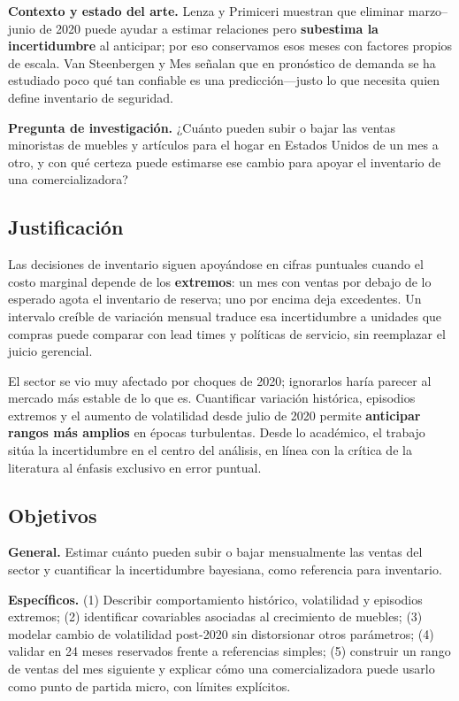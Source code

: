 \documentclass[twocolumn,10pt]{article}
\begin{document}
\textbf{Contexto y estado del arte.} Lenza y Primiceri \citep{lenza2022} muestran que eliminar marzo--junio de 2020 puede ayudar a estimar relaciones pero \textbf{subestima la incertidumbre} al anticipar; por eso conservamos esos meses con factores propios de escala. Van Steenbergen y Mes \citep{vansteenbergen2020} señalan que en pronóstico de demanda se ha estudiado poco qué tan confiable es una predicción---justo lo que necesita quien define inventario de seguridad.

\textbf{Pregunta de investigación.} ¿Cuánto pueden subir o bajar las ventas minoristas de muebles y artículos para el hogar en Estados Unidos de un mes a otro, y con qué certeza puede estimarse ese cambio para apoyar el inventario de una comercializadora?

\subsection{Justificación}
Las decisiones de inventario siguen apoyándose en cifras puntuales cuando el costo marginal depende de los \textbf{extremos}: un mes con ventas por debajo de lo esperado agota el inventario de reserva; uno por encima deja excedentes. Un intervalo creíble de variación mensual traduce esa incertidumbre a unidades que compras puede comparar con lead times y políticas de servicio, sin reemplazar el juicio gerencial.

El sector se vio muy afectado por choques de 2020; ignorarlos haría parecer al mercado más estable de lo que es. Cuantificar variación histórica, episodios extremos y el aumento de volatilidad desde julio de 2020 permite \textbf{anticipar rangos más amplios} en épocas turbulentas. Desde lo académico, el trabajo sitúa la incertidumbre en el centro del análisis, en línea con la crítica de la literatura al énfasis exclusivo en error puntual.

\subsection{Objetivos}
\textbf{General.} Estimar cuánto pueden subir o bajar mensualmente las ventas del sector y cuantificar la incertidumbre bayesiana, como referencia para inventario.

\textbf{Específicos.} (1) Describir comportamiento histórico, volatilidad y episodios extremos; (2) identificar covariables asociadas al crecimiento de muebles; (3) modelar cambio de volatilidad post-2020 sin distorsionar otros parámetros; (4) validar en 24 meses reservados frente a referencias simples; (5) construir un rango de ventas del mes siguiente y explicar cómo una comercializadora puede usarlo como punto de partida micro, con límites explícitos.
\end{document}
